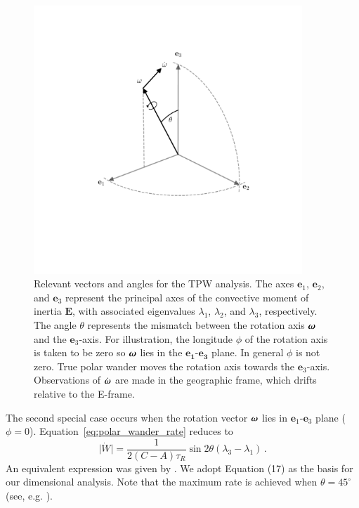 \documentclass[preprint,12pt,authoryear]{elsarticle}
\newcommand{\mitbf}[1]{\hbox{\mathversion{bold}$#1$}}
\begin{document}
\begin{figure}
\centering
\includegraphics[width=0.9\textwidth]{figures/reference_frames.pdf}
\caption{Relevant vectors and angles for the TPW analysis. The axes $\mathbf{e}_1$, $\mathbf{e}_2$, and $\mathbf{e}_3$ represent the principal axes of the convective moment of inertia $\mathbf{E}$, with associated eigenvalues $\lambda_1$, $\lambda_2$, and $\lambda_3$, respectively.  The angle $\theta$ represents the mismatch between the rotation axis $\mitbf{\omega}$ and the $\mathbf{e}_3$-axis. For illustration, the longitude $\phi$ of the rotation axis is taken to be zero so $\mitbf{\omega}$ lies in the $\mathbf{e_1}$-$\mathbf{e_3}$ plane. In general $\phi$ is not zero. True polar wander moves the rotation axis towards the $\mathbf{e}_3$-axis. Observations of $\dot{\mitbf{\omega}}$ are made in the geographic frame, which drifts relative to the E-frame.  }
\label{fig:reference_frames}
\end{figure}

The second special case occurs when the rotation vector $\mitbf{\omega}$ lies in $\mathbf{e}_1$-$\mathbf{e}_3$ plane ($\phi = 0$).
Equation~\eqref{eq:polar_wander_rate} reduces to
\begin{equation}
\vert \dot{W} \vert = 
\frac{1}{2(C-A) \tau_R}\sin{2\theta} ( \lambda_3 - \lambda_1)\, .
\label{eq:simple_milankovitch}
\end{equation}
An equivalent expression was given by \citet{tsai2007theoretical}. We adopt Equation (17) as the basis for our dimensional analysis. Note that
the maximum  rate is achieved when $\theta=45^\circ$ (see, e.g. \citet{fung1965foundations}).
\end{document}

